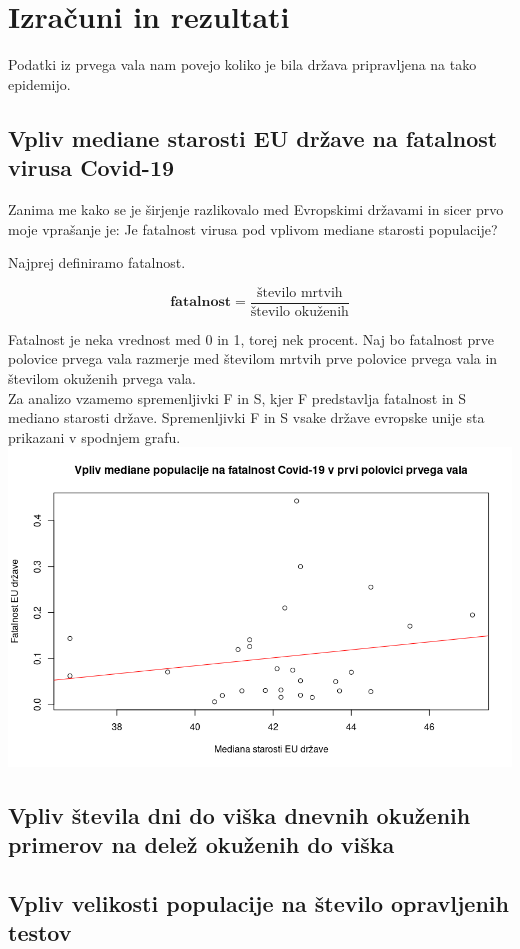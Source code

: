 \documentclass[a4paper,11pt]{article}
\begin{document}
\section{Izračuni in rezultati}
Podatki iz prvega vala nam povejo koliko je bila država pripravljena na tako epidemijo.

\subsection{Vpliv mediane starosti EU države na fatalnost virusa Covid-19}
Zanima me kako se je širjenje razlikovalo med Evropskimi državami in sicer prvo moje vprašanje je: Je fatalnost virusa pod vplivom mediane starosti populacije?

Najprej definiramo fatalnost.
\begin{center}
\[\textbf{fatalnost} = \frac{\text{število mrtvih}}{\text{število okuženih}}\]
\end{center} 
Fatalnost je neka vrednost med 0 in 1, torej nek procent. Naj bo fatalnost prve polovice prvega vala razmerje med številom mrtvih prve polovice prvega vala in številom okuženih prvega vala. \\
Za analizo vzamemo spremenljivki F in S, kjer F predstavlja fatalnost in S mediano starosti države. Spremenljivki F in S vsake države evropske unije sta prikazani v spodnjem grafu.
\includegraphics[scale=0.7]{Vpliv_mediane_populacije_na_fatalnost_Covid-19_v_prvi_polovici_vala}

\subsection{Vpliv števila dni do viška dnevnih okuženih primerov na delež okuženih do viška}
\subsection{Vpliv velikosti populacije na število opravljenih testov}
\end{document}
